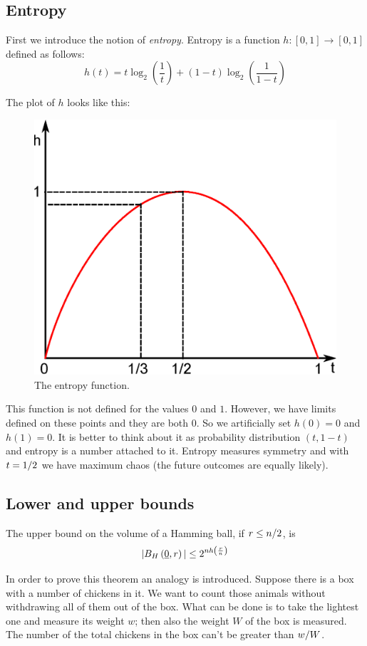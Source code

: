 \subsection{Entropy}
First we introduce the notion of \emph{entropy}. Entropy is a function $h: [0, 1] \rightarrow [0, 1]$ defined as follows:
\begin{equation}
	h(t) = t\log_2(\dfrac{1}{t}) + (1 - t)\log_2\left(\dfrac{1}{1-t}\right)
\end{equation}

The plot of $h$ looks like this:
\begin{figure}[h]
	\centering
	\includegraphics[width=0.6\linewidth]{pictures/ch01-i00.eps}
	\caption{The entropy function.}
\end{figure}

This function is not defined for the values $0$ and $1$. However, we have limits defined on these points and they are both $0$. So we artificially set $h(0) = 0$ and $h(1) = 0$. It is better to think about it as probability distribution $(t, 1 - t)$ and entropy is a number attached to it. Entropy measures symmetry and with $t = {1}/{2}$ we have maximum chaos (the future outcomes are equally likely).

\subsection{Lower and upper bounds}

\begin{thm}
	The upper bound on the volume of a Hamming ball, if $ r \leq {n}/{2}$, is
	$$|B_H\left(\underline{0}, r\right)| \leq 2^{nh\left(\frac{r}{n}\right)}$$
\end{thm}

In order to prove this theorem an analogy is introduced. Suppose there is a box with a number of chickens in it. We want to count those animals without withdrawing all of them out of the box. What can be done is to take the lightest one and measure its weight $w$; then also the weight $W$ of the box is measured. The number of the total chickens in the box can't be greater than ${w}/{W}$.\\


